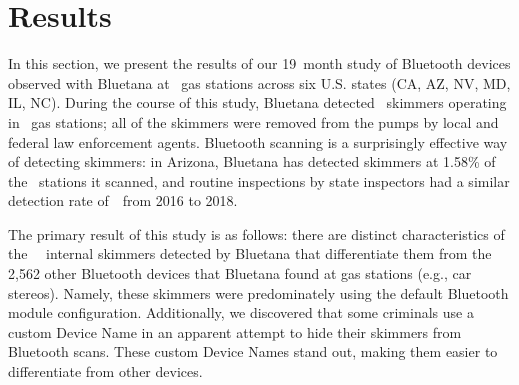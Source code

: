 
\section{Results}
\label{sec:bluetooth}

In this section, we present the results of our 19~month study of Bluetooth
devices observed with Bluetana at \visitedgasstations~gas stations across six U.S.
states (CA, AZ, NV, MD, IL, NC).
%
During the course of this study, Bluetana detected \totalskimmers~skimmers operating in \Bluetanaskimstations~gas
stations; all of the skimmers were removed from the pumps by local and
federal law enforcement agents.
%
Bluetooth scanning is a surprisingly effective way of detecting skimmers: in
Arizona, Bluetana has detected skimmers at 1.58\% of the \visitedgasstationsAZ~stations it
scanned, and routine inspections by state
inspectors had a similar detection rate of~\azpercentskimfound~from 2016 to 2018.
 
The primary result of this study is as follows: there are distinct characteristics of the
~\totalskimmers~internal skimmers detected by Bluetana that differentiate
them from the 2,562 other Bluetooth devices that Bluetana found 
at gas stations (e.g., car stereos).
%
Namely, these skimmers were predominately using the default Bluetooth module configuration.
%
Additionally, we discovered that some criminals use a custom Device Name 
in an apparent attempt to hide their skimmers from Bluetooth scans.
%
These custom Device Names stand out, making them easier to differentiate from other devices.


%

%

%


